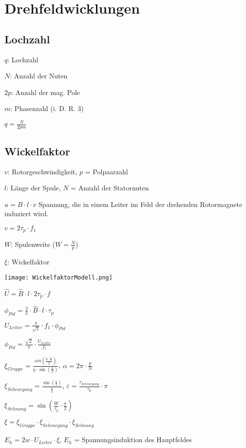 \documentclass[german]{latex4ei/latex4ei_sheet}
\begin{document}
\section{Drehfeldwicklungen}
	\begin{sectionbox}
		
			\subsection{Lochzahl}
				\begin{symbolbox}
					\item $q$: Lochzahl
					\item $N$: Anzahl der Nuten
					\item $2p$: Anzahl der mag. Pole
					\item $m$: Phasenzahl (i. D. R. 3)
					\item  $q = \frac{N}{2 p m}$
				\end{symbolbox}
			\subsection{Wickelfaktor}
				\begin{bluebox}
					\item $v$: Rotorgeschwindigkeit, $p$ = Polpaarzahl
					\item $l$: Länge der Spule, $N$ = Anzahl der Statornuten
					\item $u = B\cdot l \cdot v$ Spannung, die in einem Leiter im Feld der drehenden Rotormagnete induziert wird.
					\item $v = 2\tau_p\cdot f_1$
					\item $W$: Spulenweite ($W = \frac{N}{p}$)
					\item $\xi$: Wickelfaktor
					\item \texttt{[image: WickelfaktorModell.png]}
					\item $\hat{U} = \hat{B}\cdot l\cdot 2\tau_p \cdot f$
					\item $\phi_{Pol} = \frac{2}{\pi} \cdot \hat{B}\cdot l \cdot \tau_p$
					\item $U_{Leiter} = \frac{\pi}{\sqrt{2}}\cdot f_1 \cdot \phi_{Pol}$
					\item $\phi_{Pol} = \frac{\sqrt{2}}{\pi}\cdot \frac{U_{Leiter}}{f_1}$
					\item $\xi_{Gruppe} = \frac{sin\left(\frac{q\cdot \frac{\alpha}{2}}{2}\right)}{q\cdot \sin\left(\frac{\alpha}{2}\right)}$, $\alpha = 2\pi \cdot \frac{p}{N}$
					\item $\xi_{Schraegung} = \frac{\sin(\frac{\varepsilon}{2})}{\frac{\varepsilon}{2}}$, $\varepsilon = \frac{\tau_{Schraegung}}{\tau_p}\cdot \pi$
					\item $\xi_{Sehnung} = \sin\left(\frac{W}{\tau_p}\cdot \frac{\pi}{2}\right)$
					\item $\xi = \xi_{Gruppe} \cdot \xi_{Schraegung} \cdot \xi_{Sehnung}$
					\item $E_h = 2w\cdot U_{Leiter}\cdot \xi$, $E_h$ = Spannungsinduktion des Hauptfeldes
				\end{bluebox}
	\end{sectionbox}
\end{document}
